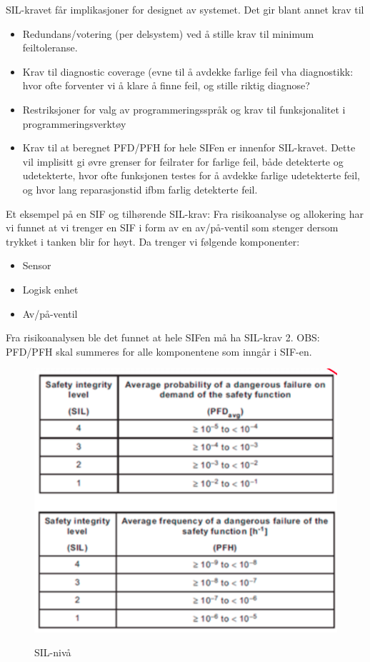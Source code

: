 SIL-kravet får implikasjoner for designet av systemet. Det gir blant annet krav til 

\begin{itemize}
    \item Redundans/votering (per delsystem) ved å stille krav til minimum feiltoleranse.
    \item Krav til diagnostic coverage (evne til å avdekke farlige feil vha diagnostikk: hvor ofte forventer vi å klare å finne feil, og stille riktig diagnose?
    \item Restriksjoner for valg av programmeringsspråk og krav til funksjonalitet i programmeringsverktøy
    \item Krav til at beregnet PFD/PFH for hele SIFen er innenfor SIL-kravet. Dette vil implisitt gi øvre grenser for feilrater for farlige feil, både detekterte og udetekterte, hvor ofte funksjonen testes for å avdekke farlige udetekterte feil, og hvor lang reparasjonstid ifbm farlig detekterte feil.
\end{itemize}

Et eksempel på en SIF og tilhørende SIL-krav:
Fra risikoanalyse og allokering har vi funnet at vi trenger en SIF i form av en av/på-ventil som stenger dersom trykket i tanken blir for høyt. Da trenger vi følgende komponenter:

\begin{itemize}
    \item Sensor
    \item Logisk enhet
    \item Av/på-ventil
\end{itemize}

Fra risikoanalysen ble det funnet at hele SIFen må ha SIL-krav 2. OBS: PFD/PFH skal summeres for alle komponentene som inngår i SIF-en.

\begin{figure}[H]
    \centering
        \includegraphics[width=\textwidth]{figures/IEC/sil.png}\\
        \caption{SIL-nivå}
\end{figure}

